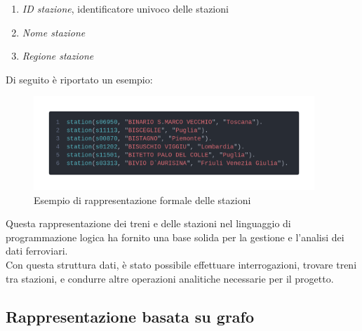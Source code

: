 \documentclass[italian,12pt,a4paper]{article}
\begin{document}
		\begin{enumerate}
			\item \textit{ID stazione}, identificatore univoco delle stazioni
			\item \textit{Nome stazione}
			\item \textit{Regione stazione}
		\end{enumerate}
		Di seguito è riportato un esempio:
	
		\begin{figure}[!h]
			\centering
			\includegraphics[width=400px]{img/code_prolog2}
			\caption{Esempio di rappresentazione formale delle stazioni}
		\end{figure}
		\vspace{10px}
		\setlength{\parindent}{0cm}
		Questa rappresentazione dei treni e delle stazioni nel linguaggio di programmazione logica ha fornito una base solida per la gestione e l'analisi dei dati ferroviari. \\
		\linebreak
		Con questa struttura dati, è stato possibile effettuare interrogazioni, trovare treni tra stazioni, e condurre altre operazioni analitiche necessarie per il progetto.

\subsection{Rappresentazione basata su grafo}
\end{document}
